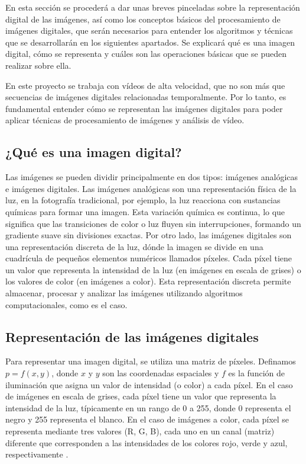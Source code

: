En esta sección se procederá a dar unas breves pinceladas sobre la representación digital de las imágenes, así como los conceptos básicos del procesamiento de imágenes digitales, que serán necesarios para entender los algoritmos y técnicas que se desarrollarán en los siguientes apartados. Se explicará qué es una imagen digital, cómo se representa y cuáles son las operaciones básicas que se pueden realizar sobre ella.

En este proyecto se trabaja con vídeos de alta velocidad, que no son más que secuencias de imágenes digitales relacionadas temporalmente. Por lo tanto, es fundamental entender cómo se representan las imágenes digitales para poder aplicar técnicas de procesamiento de imágenes y análisis de vídeo.

\subsection{¿Qué es una imagen digital?}

Las imágenes se pueden dividir principalmente en dos tipos: imágenes analógicas e imágenes digitales. Las imágenes analógicas son una representación física de la luz, en la fotografía tradicional, por ejemplo, la luz reacciona con sustancias químicas para formar una imagen. Esta variación química es continua, lo que significa que las transiciones de color o luz fluyen sin interrupciones, formando un gradiente suave sin divisiones exactas. Por otro lado, las imágenes digitales son una representación discreta de la luz, dónde la imagen se divide en una cuadrícula de pequeños elementos numéricos llamados píxeles. Cada píxel tiene un valor que representa la intensidad de la luz (en imágenes en escala de grises) o los valores de color (en imágenes a color). Esta representación discreta permite almacenar, procesar y analizar las imágenes utilizando algoritmos computacionales, como es el caso.

\subsection{Representación de las imágenes digitales}

Para representar una imagen digital, se utiliza una matriz de píxeles. Definamos $p = f(x, y)$, donde $x$ y $y$ son las coordenadas espaciales y $f$ es la función de iluminación que asigna un valor de intensidad (o color) a cada píxel. En el caso de imágenes en escala de grises, cada píxel tiene un valor que representa la intensidad de la luz, típicamente en un rango de 0 a 255, donde 0 representa el negro y 255 representa el blanco. En el caso de imágenes a color, cada píxel se representa mediante tres valores (R, G, B), cada uno en un canal (matriz) diferente que corresponden a las intensidades de los colores rojo, verde y azul, respectivamente \cite{gonzalez2018digital}.

